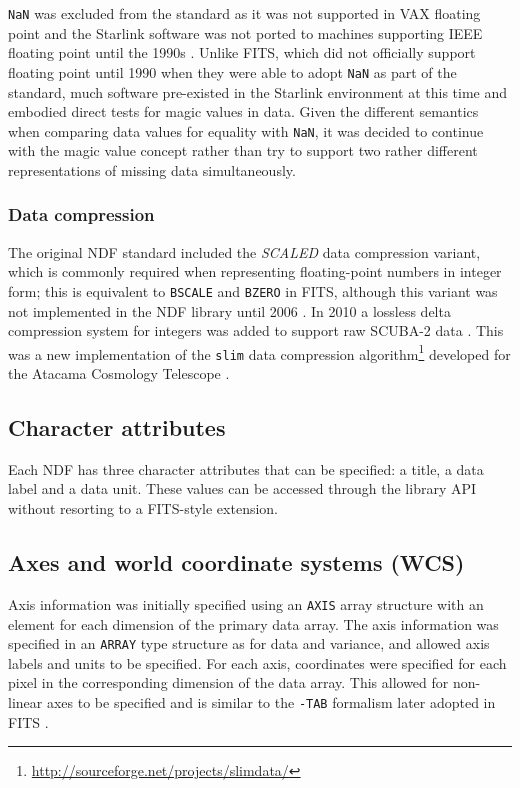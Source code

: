 \documentclass[final,authoryear,5p,times,twocolumn]{elsarticle}
\begin{document}
\texttt{NaN} was excluded from the standard as it was not
supported in VAX floating point \citep[see e.g.][]{660194} and the Starlink
software was not ported to machines supporting IEEE floating point
until the 1990s \citep[e.g.,][]{1991STARB...8...11C}. Unlike FITS, which
did not officially support floating point until 1990
\citep{1989FPFITS,1991BAAS...23..993S} when they were able to adopt
\texttt{NaN} as part of the standard, much software pre-existed
in the Starlink environment at this time and embodied
direct tests for magic values in data. Given the different semantics
when comparing data values for equality with \texttt{NaN}, it was decided to
continue with the magic value concept rather than try to support two
rather different representations of missing data simultaneously.

\subsubsection{Data compression}

The original NDF standard included the \emph{SCALED} data compression
variant, which is commonly required when representing floating-point numbers in
integer form; this is equivalent to \texttt{BSCALE} and \texttt{BZERO} in
FITS, although this variant was not implemented in the NDF library
until 2006 \citep{2008ASPC..394..650C}. In 2010 a lossless delta
compression system for integers was added to support raw SCUBA-2 data
\citep{2013MNRAS.430.2513H}. This was a new implementation of the
\texttt{slim} data compression
algorithm\footnote{\url{http://sourceforge.net/projects/slimdata/}}
developed for the Atacama Cosmology Telescope
\citep[][]{2004SPIE.5498....1F}.

\subsection{Character attributes}

Each NDF has three character attributes that can be specified: a
title, a data label and a data unit. These values can be accessed
through the library API without resorting to a FITS-style extension.

\subsection{Axes and world coordinate systems (WCS)}
\label{sec:wcs}

Axis information was initially specified using an \texttt{AXIS} array
structure with an element for each dimension of the primary data
array. The axis information was specified in an \texttt{ARRAY} type
structure as for data and variance, and allowed axis labels and units
to be specified. For each axis, coordinates were specified for each
pixel in the corresponding dimension of the data array. This allowed
for non-linear axes to be specified and is similar to the
\texttt{-TAB} formalism later adopted in FITS \citep{2006A&A...446..747G}.
\end{document}
